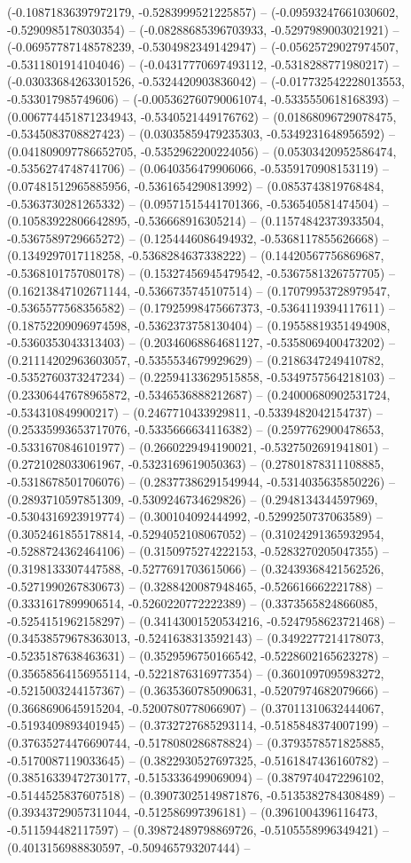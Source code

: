 (-0.10871836397972179, -0.5283999521225857) -- (-0.09593247661030602, -0.5290985178030354) -- (-0.08288685396703933, -0.5297989003021921) -- (-0.06957787148578239, -0.5304982349142947) -- (-0.05625729027974507, -0.5311801914104046) -- (-0.04317770697493112, -0.5318288771980217) -- (-0.03033684263301526, -0.5324420903836042) -- (-0.017732542228013553, -0.533017985749606) -- (-0.005362760790061074, -0.5335550618168393) -- (0.006774451871234943, -0.5340521449176762) -- (0.01868096729078475, -0.5345083708827423) -- (0.03035859479235303, -0.5349231648956592) -- (0.041809097786652705, -0.5352962200224056) -- (0.05303420952586474, -0.5356274748741706) -- (0.0640356479906066, -0.5359170908153119) -- (0.07481512965885956, -0.5361654290813992) -- (0.0853743819768484, -0.5363730281265332) -- (0.09571515441701366, -0.536540581474504) -- (0.10583922806642895, -0.536668916305214) -- (0.11574842373933504, -0.5367589729665272) -- (0.1254446086494932, -0.5368117855626668) -- (0.1349297017118258, -0.5368284637338222) -- (0.14420567756869687, -0.5368101757080178) -- (0.15327456945479542, -0.5367581326757705) -- (0.16213847102671144, -0.5366735745107514) -- (0.17079953728979547, -0.5365577568356582) -- (0.17925998475667373, -0.5364119394117611) -- (0.18752209096974598, -0.5362373758130404) -- (0.19558819351494908, -0.5360353043313403) -- (0.20346068864681127, -0.5358069400473202) -- (0.21114202963603057, -0.5355534679929629) -- (0.2186347249410782, -0.5352760373247234) -- (0.22594133629515858, -0.5349757564218103) -- (0.23306447678965872, -0.5346536888212687) -- (0.24000680902531724, -0.534310849900217) -- (0.2467710433929811, -0.5339482042154737) -- (0.25335993653717076, -0.5335666634116382) -- (0.2597762900478653, -0.5331670846101977) -- (0.2660229494190021, -0.5327502691941801) -- (0.2721028033061967, -0.5323169619050363) -- (0.27801878311108885, -0.5318678501706076) -- (0.28377386291549944, -0.5314035635850226) -- (0.2893710597851309, -0.5309246734629826) -- (0.2948134344597969, -0.5304316923919774) -- (0.300104092444992, -0.5299250737063589) -- (0.3052461855178814, -0.5294052108067052) -- (0.31024291365932954, -0.5288724362464106) -- (0.3150975274222153, -0.5283270205047355) -- (0.3198133307447588, -0.5277691703615066) -- (0.32439368421562526, -0.5271990267830673) -- (0.3288420087948465, -0.526616662221788) -- (0.3331617899906514, -0.5260220772222389) -- (0.3373565824866085, -0.5254151962158297) -- (0.34143001520534216, -0.5247958623721468) -- (0.34538579678363013, -0.5241638313592143) -- (0.3492277214178073, -0.5235187638463631) -- (0.3529596750166542, -0.5228602165623278) -- (0.35658564156955114, -0.5221876316977354) -- (0.3601097095983272, -0.5215003244157367) -- (0.3635360785090631, -0.5207974682079666) -- (0.3668690645915204, -0.5200780778066907) -- (0.37011310632444067, -0.5193409893401945) -- (0.3732727685293114, -0.5185848374007199) -- (0.37635274476690744, -0.5178080286878824) -- (0.3793578571825885, -0.5170087119033645) -- (0.3822930527697325, -0.5161847436160782) -- (0.38516339472730177, -0.5153336499069094) -- (0.3879740472296102, -0.5144525837607518) -- (0.39073025149871876, -0.5135382784308489) -- (0.39343729057311044, -0.512586997396181) -- (0.3961004396116473, -0.511594482117597) -- (0.39872489798869726, -0.5105558996349421) -- (0.4013156988830597, -0.509465793207444) -- 